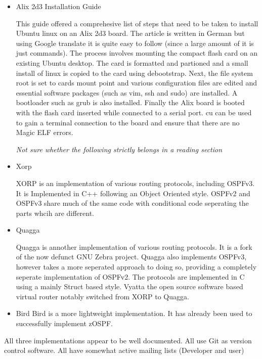 \documentclass[12pt]{report}
\begin{document}
	\begin{itemize}

	\item Alix 2d3 Installation Guide

	This guide offered a comprehesive list of steps that need to be taken to install Ubuntu linux on an Alix 2d3 board.
	The article is written in German but using Google translate it is quite easy to follow (since a large amount of it is just commands).
	The process involves mounting the compact flash card on an existing Ubuntu desktop. 
	The card is formatted and partioned and a small install of linux is copied to the card using debootstrap. 
	Next, the file system root is set to cards mount point and various configuration files are edited and essential software packages 
	(such as vim, ssh and sudo) are installed. A bootloader such as grub is also installed. 
	Finally the Alix board is booted with the flash card inserted while connected to a serial port. 
	cu can be used to gain a terminal connection to the board and ensure that there are no Magic ELF errors. 

	\em Not sure whether the following strictly belongs in a reading section \em

	\item Xorp
	
	XORP is an implementation of various routing protocols, including OSPFv3. 
	It is Implemented in C++ following an Object Oriented style. 
	OSPFv2 and OSPFv3 share much of the same code with conditional code seperating the parts whcih are different.
	
	\item Quagga
	
	Quagga is annother implementation of various routing protocols. 
	It is a fork of the now defunct GNU Zebra project. 
	Quagga also implements OSPFv3, however takes a more seperated approach to doing so, providing a completely seperate implementation of OSPFv2. 	
	The protocols are implemented in C  using a mainly Struct based style.
	Vyatta the open source software based virtual router notably switched from XORP to Quagga. 

	\item Bird
	Bird is a more lightweight implementation. 
	It has already been used to successfully implement zOSPF.

\end{itemize}

	All three implementations appear to be well documented. 
	All use Git as version control software.
	All have somewhat active mailing lists (Developer and user)
\end{document}
